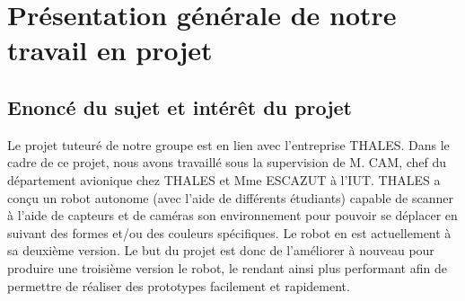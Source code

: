 \documentclass{PackagerQualityN}
\begin{document}
\newp       %
\setcounter{tocdepth}{2}
\tableofcontents
{}









\newp       %
\paragraph{}

\section*{Présentation générale de notre travail en projet}
\subsection*{Enoncé du sujet et intérêt du projet}
Le projet tuteuré de notre groupe est en lien avec l’entreprise THALES.
Dans le cadre de ce projet, nous avons travaillé sous la supervision de M. CAM, chef du département avionique chez THALES et Mme ESCAZUT à l’IUT.
THALES a conçu un robot autonome (avec l'aide de différents étudiants) capable de scanner à l’aide de capteurs et de caméras son environnement pour pouvoir se déplacer en suivant des formes et/ou des couleurs spécifiques. Le robot en est actuellement à sa deuxième version. Le but du projet est donc de l'améliorer à nouveau pour produire une troisième version le robot, le rendant ainsi plus performant afin de permettre de réaliser des prototypes facilement et rapidement.\\
\end{document}
